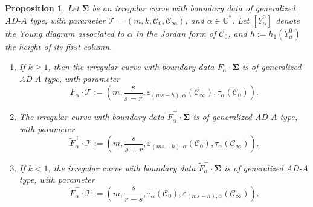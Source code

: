 \documentclass[10pt,a4paper]{amsart}
\newtheorem{proposition}{Proposition}
\begin{document}
\begin{proposition}
\label{prop:transf_parameter_elementary_transf_twist}
Let $\bm\Sigma$ be an irregular curve with boundary data of generalized  AD-$A$ type, with parameter $\mathcal T=(m,k,\mathcal C_0, \mathcal C_\infty)$, and $\alpha\in \mathbb C^*$. Let $[Y^0_\alpha]$ denote the Young diagram associated to $\alpha$ in the Jordan form of $\mathcal C_0$, and $h:=h_1(Y^0_\alpha)$ the height of its first column. 
\begin{enumerate}
\item If $k\geq 1$, then the irregular curve with boundary data $F_\alpha\cdot \bm\Sigma$ is  of generalized AD-$A$ type, with parameter
\begin{equation}
F_\alpha\cdot \mathcal T:=\left(m,\frac{s}{s-r},\varepsilon_{(ms-h),\alpha}(\mathcal C_{\infty}), \tau_\alpha(\mathcal C_0)\right).
\end{equation}
\item The irregular curve with boundary data $\widetilde F^+_\alpha\cdot \bm\Sigma$ is of generalized  AD-$A$ type, with parameter
\begin{equation}
\widetilde F^+_\alpha\cdot \mathcal T:=\left(m,\frac{s}{s+r},\varepsilon_{(ms-h),\alpha}(\mathcal C_{0}), \tau_\alpha(\mathcal C_\infty)\right) .
\end{equation}
\item If $k<1$, the irregular curve with boundary data $\widetilde F^-_\alpha\cdot \bm\Sigma$ is of  generalized AD-$A$ type, with parameter
\begin{equation}
\widetilde F^-_\alpha\cdot \mathcal T:=\left(m,\frac{s}{r-s},\tau_\alpha(\mathcal C_{0}), \varepsilon_{(ms-h),\alpha}(\mathcal C_\infty)\right).
\end{equation}
\end{enumerate}
\end{proposition}
\end{document}
